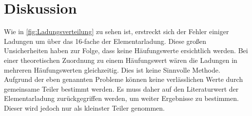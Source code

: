 


\section{Diskussion}
\label{sec:Diskussion}

Wie in \autoref{fig:Ladungsverteilung} zu sehen ist, erstreckt sich der Fehler einiger Ladungen um über das 16-fache der Elementarladung. 
Diese großen Unsicherheiten haben zur Folge, dass keine Häufungswerte ersichtlich werden. Bei einer theoretischen Zuordnung zu einem Häufungswert wären 
die Ladungen in mehreren Häufungswerten gleichzeitig. Dies ist keine Sinnvolle Methode.
Aufgrund der eben genannten Probleme können keine verlässlichen Werte durch gemeinsame Teiler bestimmt werden. Es muss daher auf den 
Literaturwert der Elementarladung zurückgegriffen werden, um weiter Ergebnisse zu bestimmen. Dieser wird jedoch nur als kleinster Teiler genommen. 



